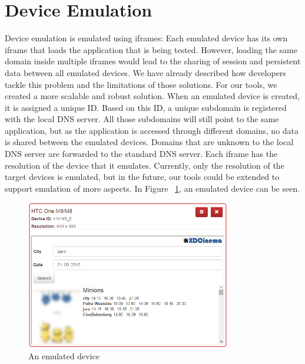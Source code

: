 \section{Device Emulation}

Device emulation is emulated using iframes: Each emulated device has its own iframe that loads the application that is being tested. However, loading the same domain inside multiple iframes would lead to the sharing of session and persistent data between all emulated devices. We have already described how developers tackle this problem and the limitations of those solutions. For our tools, we created a more scalable and robust solution. When an emulated device is created, it is assigned a unique ID. Based on this ID, a unique subdomain is registered with the local DNS server. All those subdomains will still point to the same application, but as the application is accessed through different domains, no data is shared between the emulated devices. Domains that are unknown to the local DNS server are forwarded to the standard DNS server. Each iframe has the resolution of the device that it emulates. Currently, only the resolution of the target devices is emulated, but in the future, our tools could be extended to support emulation of more aspects. In Figure ~\ref{fig:emulated_device}, an emulated device can be seen.

\begin{figure}[H]
  \centering
    \includegraphics[width=0.8\textwidth]{images/screenshots/emulated_device_3.png}
	\caption{An emulated device}
	\label{fig:emulated_device}
\end{figure}

